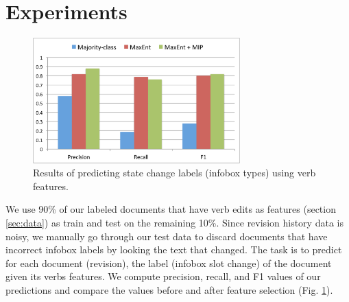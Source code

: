 \section{Experiments}

\begin{figure}
\begin{center}
\includegraphics[width=8cm,keepaspectratio=true]{figures/result.pdf}
\caption{\label{fig:result} Results of predicting state change labels (infobox types) using verb features.}
\end{center}
\end{figure}

We use 90\% of our labeled documents that have verb edits as features (section \ref{sec:data}) as train and test on the remaining 10\%. Since revision history data is noisy, we manually go through our test data to discard documents that have incorrect infobox  labels by looking the  text that  changed. The task is to predict for each document (revision), the label (infobox slot change) of the document given its verbs features. We compute precision, recall, and F1 values of our predictions  and compare the values before and after feature selection (Fig. \ref{fig:result}).


